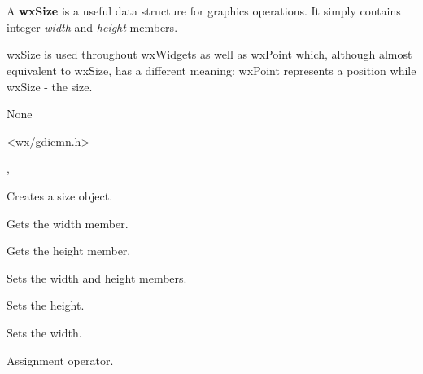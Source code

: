 \section{}\label{wxsize}

A {\bf wxSize} is a useful data structure for graphics operations.
It simply contains integer {\it width} and {\it height} members.

wxSize is used throughout wxWidgets as well as wxPoint which, although almost
equivalent to wxSize, has a different meaning: wxPoint represents a position
while wxSize - the size.



None


<wx/gdicmn.h>


, 





Creates a size object.

\label{wxsizegetwidth}


Gets the width member.

\label{wxsizegetheight}


Gets the height member.

\label{wxsizeset}


Sets the width and height members.

\label{wxsizesetheight}


Sets the height.

\label{wxsizesetwidth}


Sets the width.



Assignment operator.


